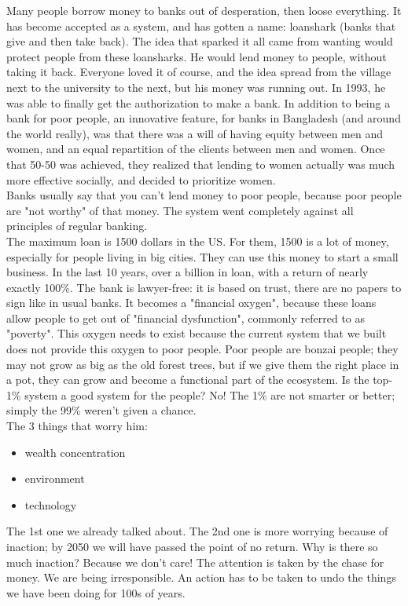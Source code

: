 \documentclass{Article}
\begin{document}
 Many people borrow money to banks out of desperation, then loose everything. It has become accepted as a system, and has gotten a name: loanshark (banks that give and then take back). The idea that sparked it all came from wanting would protect people from these loansharks. He would lend money to people, without taking it back. Everyone loved it of course, and the idea spread from the village next to the university to the next, but his money was running out. In 1993, he was able to finally get the authorization to make a bank. In addition to being a bank for poor people, an innovative feature, for banks in Bangladesh (and around the world really), was that there was a will of having equity between men and women, and an equal repartition of the clients between men and women. Once that 50-50 was achieved, they realized that lending to women actually was much more effective socially, and decided to prioritize women. \\
 Banks usually say that you can't lend money to poor people, because poor people are "not worthy" of that money. The system went completely against all principles of regular banking. \\
The maximum loan is 1500 dollars in the US. For them, 1500 is a lot of money, especially for people living in big cities. They can use this money to start a small business. In the last 10 years, over a billion in loan, with a return of nearly exactly 100\%. The bank is lawyer-free: it is based on trust, there are no papers to sign like in usual banks. It becomes a "financial oxygen", because these loans allow people to get out of "financial dysfunction", commonly referred to as "poverty". This oxygen needs to exist because the current system that we built does not provide this oxygen to poor people. Poor people are bonzai people; they may not grow as big as the old forest trees, but if we give them the right place in a pot, they can grow and become a functional part of the ecosystem. Is the top-1\% system a good system for the people? No! The 1\% are not smarter or better; simply the 99\% weren't given a chance. \\

The 3 things that worry him:
\begin{itemize}
	\item wealth concentration
	\item environment
	\item technology
\end{itemize}

The 1st one we already talked about. The 2nd one is more worrying because of inaction; by 2050 we will have passed the point of no return. Why is there so much inaction? Because we don't care! The attention is taken by the chase for money. We are being irresponsible. An action has to be taken to undo the things we have been doing for 100s of years. \\
\end{document}
